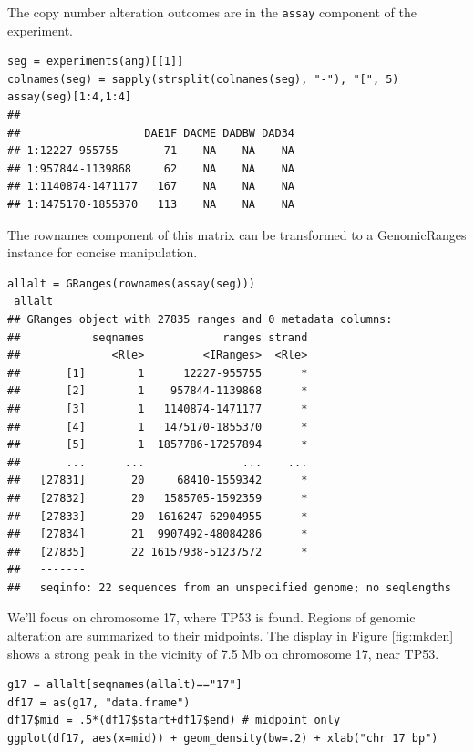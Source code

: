 The copy number alteration outcomes are in the
\texttt{assay} component of the experiment.

\begin{shaded}
\begin{verbatim}
seg = experiments(ang)[[1]]
colnames(seg) = sapply(strsplit(colnames(seg), "-"), "[", 5)
assay(seg)[1:4,1:4]
##
##                   DAE1F DACME DADBW DAD34
## 1:12227-955755       71    NA    NA    NA
## 1:957844-1139868     62    NA    NA    NA
## 1:1140874-1471177   167    NA    NA    NA
## 1:1475170-1855370   113    NA    NA    NA
\end{verbatim}
\end{shaded}

The rownames component of this matrix can be transformed to
a GenomicRanges instance for concise manipulation.

\begin{shaded}
\begin{verbatim}
allalt = GRanges(rownames(assay(seg)))
 allalt
## GRanges object with 27835 ranges and 0 metadata columns:
##           seqnames            ranges strand
##              <Rle>         <IRanges>  <Rle>
##       [1]        1      12227-955755      *
##       [2]        1    957844-1139868      *
##       [3]        1   1140874-1471177      *
##       [4]        1   1475170-1855370      *
##       [5]        1  1857786-17257894      *
##       ...      ...               ...    ...
##   [27831]       20     68410-1559342      *
##   [27832]       20   1585705-1592359      *
##   [27833]       20  1616247-62904955      *
##   [27834]       21  9907492-48084286      *
##   [27835]       22 16157938-51237572      *
##   -------
##   seqinfo: 22 sequences from an unspecified genome; no seqlengths
\end{verbatim}
\end{shaded}


We'll focus on chromosome 17, where TP53 is found. Regions
of genomic alteration are summarized to their midpoints.
The display in Figure \ref{fig:mkden} shows a strong peak in the vicinity of 7.5 Mb on chromosome 17, near TP53.

\begin{shaded}
\begin{verbatim}
g17 = allalt[seqnames(allalt)=="17"]
df17 = as(g17, "data.frame")
df17$mid = .5*(df17$start+df17$end) # midpoint only
ggplot(df17, aes(x=mid)) + geom_density(bw=.2) + xlab("chr 17 bp")
\end{verbatim}
\end{shaded}


